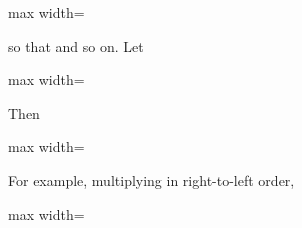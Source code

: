 \documentclass[11pt,oneside]{article}
\begin{document}
\begin{BookBody}
\begin{center}\begin{adjustbox}{max width=\linewidth}\end{adjustbox}\end{center}

\noindent so that  and so on. Let

\begin{center}\begin{adjustbox}{max width=\linewidth}\end{adjustbox}\end{center}

\noindent Then

\begin{center}\begin{adjustbox}{max width=\linewidth}\end{adjustbox}\end{center}

\noindent For example, multiplying in right-to-left order,

\begin{center}\begin{adjustbox}{max width=\linewidth}\end{adjustbox}\end{center} \BookEnd{\blacktriangle}



\end{BookBody}
\end{document}
